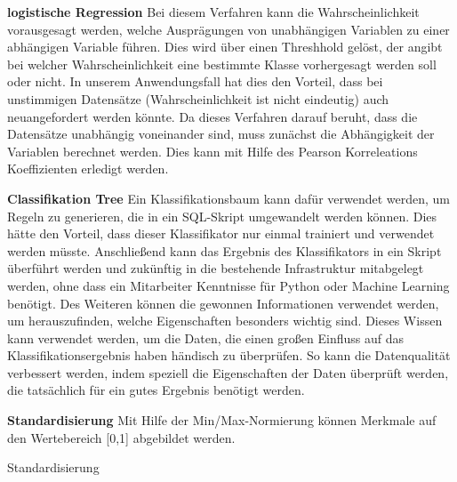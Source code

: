 \textbf{logistische Regression} %
Bei diesem Verfahren kann die Wahrscheinlichkeit vorausgesagt werden, welche Ausprägungen von unabhängigen Variablen zu einer abhängigen Variable führen. 
Dies wird über einen Threshhold gelöst, der angibt bei welcher Wahrscheinlichkeit eine bestimmte Klasse vorhergesagt werden soll oder nicht.
In unserem Anwendungsfall hat dies den Vorteil, dass bei unstimmigen Datensätze (Wahrscheinlichkeit ist nicht eindeutig) auch neuangefordert werden könnte. 
Da dieses Verfahren darauf beruht, dass die Datensätze unabhängig voneinander sind, muss zunächst die Abhängigkeit der Variablen berechnet werden.
Dies kann mit Hilfe des Pearson Korreleations Koeffizienten erledigt werden.

\textbf{Classifikation Tree}
Ein Klassifikationsbaum kann dafür verwendet werden, um Regeln zu generieren, die in ein SQL-Skript umgewandelt werden können.
Dies hätte den Vorteil, dass dieser Klassifikator nur einmal trainiert und verwendet werden müsste.
Anschließend kann das Ergebnis des Klassifikators in ein Skript überführt werden und zukünftig in die bestehende Infrastruktur mitabgelegt werden, ohne dass ein Mitarbeiter Kenntnisse für Python oder Machine Learning benötigt. 
Des Weiteren können die gewonnen Informationen verwendet werden, um herauszufinden, welche Eigenschaften besonders wichtig sind.
Dieses Wissen kann verwendet werden, um die Daten, die einen großen Einfluss auf das Klassifikationsergebnis haben händisch zu überprüfen. 
So kann die Datenqualität verbessert werden, indem speziell die Eigenschaften der Daten überprüft werden, die tatsächlich für ein gutes Ergebnis benötigt werden.





\textbf{Standardisierung}
Mit Hilfe der Min/Max-Normierung können Merkmale auf den Wertebereich [0,1] abgebildet werden. 

Standardisierung





